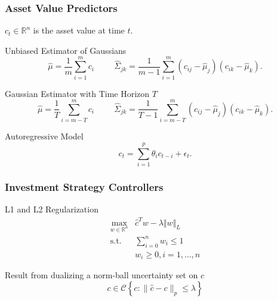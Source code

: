 \documentclass{beamer}
\begin{document}
\begin{frame}
\frametitle{Asset Value Predictors}

    $c_t \in \mathbb{R}^n$ is the asset value at time $t$.

    \begin{block}{Unbiased Estimator of Gaussians}
    \[ \hat{\mu} = \frac{1}{m} \sum_{i=1}^{m} c_i \hspace{1cm} \hat{\Sigma}_{jk} = \frac{1}{m-1} \sum_{i=1}^{m} (c_{ij} - \hat{\mu}_j)(c_{ik} - \hat{\mu}_k). \]
    \end{block}

    \begin{block}{Gaussian Estimator with Time Horizon $T$}
    \[ \hat{\mu} = \frac{1}{T} \sum_{i=m-T}^{m} c_i \hspace{1cm} \hat{\Sigma}_{jk} = \frac{1}{T-1} \sum_{i=m-T}^{m} (c_{ij} - \hat{\mu}_j)(c_{ik} - \hat{\mu}_k). \]
    \end{block}

    \begin{block}{Autoregressive Model}
    \[ c_t = \sum_{i=1}^p \theta_i c_{t-i} + \epsilon_t. \]
    \end{block}

\end{frame}

\begin{frame}
\frametitle{Investment Strategy Controllers}

    \begin{block}{L1 and L2 Regularization}
    \begin{align*}
        \max_{w\in\mathbb{R}^n}{} & \hat{c}^T w - \lambda \Vert w \Vert_L \\
        \mbox{s.t.} & \sum_{i=0}^{n} w_i \leq 1 \\
        & w_i \geq 0, i=1,...,n
    \end{align*}
    \end{block}

    \begin{center}
        Result from dualizing a norm-ball uncertainty set on $c$ \\
        \[ c \in \mathcal{C}\left\{ c : \|\hat{c} - c\|_p \leq \lambda \right\} \]
    \end{center}

\end{frame}
\end{document}
